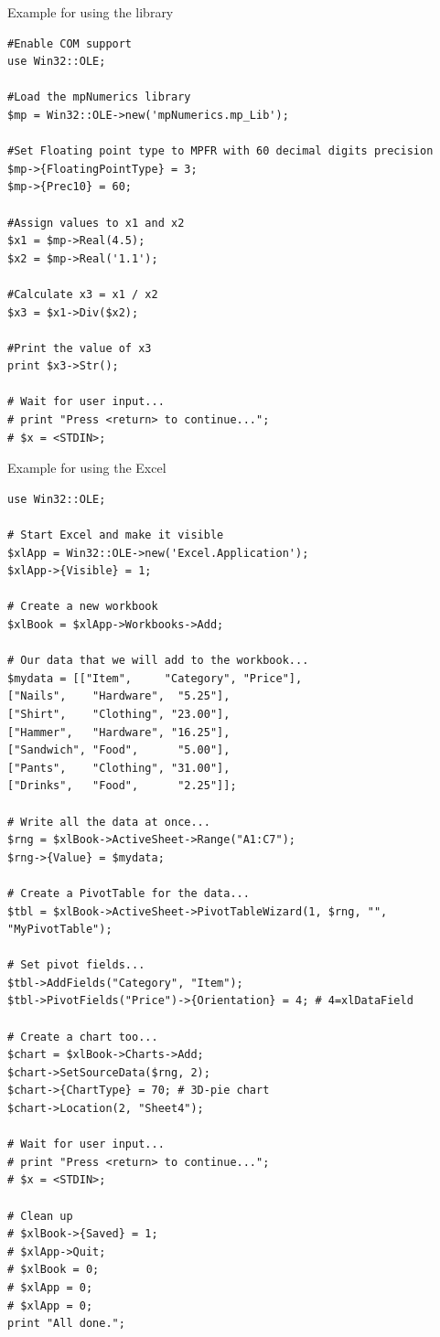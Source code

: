 \vpara
Example for using the library

\begin{lstlisting}
#Enable COM support
use Win32::OLE;

#Load the mpNumerics library
$mp = Win32::OLE->new('mpNumerics.mp_Lib');

#Set Floating point type to MPFR with 60 decimal digits precision
$mp->{FloatingPointType} = 3;
$mp->{Prec10} = 60;

#Assign values to x1 and x2
$x1 = $mp->Real(4.5);
$x2 = $mp->Real('1.1');

#Calculate x3 = x1 / x2
$x3 = $x1->Div($x2);

#Print the value of x3
print $x3->Str();

# Wait for user input...
# print "Press <return> to continue...";
# $x = <STDIN>;
\end{lstlisting}


\vpara
Example for using the Excel

\begin{lstlisting}
use Win32::OLE;

# Start Excel and make it visible
$xlApp = Win32::OLE->new('Excel.Application');
$xlApp->{Visible} = 1;

# Create a new workbook
$xlBook = $xlApp->Workbooks->Add;

# Our data that we will add to the workbook...
$mydata = [["Item",     "Category", "Price"], 
["Nails",    "Hardware",  "5.25"],
["Shirt",    "Clothing", "23.00"],
["Hammer",   "Hardware", "16.25"],
["Sandwich", "Food",      "5.00"],
["Pants",    "Clothing", "31.00"],
["Drinks",   "Food",      "2.25"]];

# Write all the data at once...
$rng = $xlBook->ActiveSheet->Range("A1:C7");
$rng->{Value} = $mydata;

# Create a PivotTable for the data...
$tbl = $xlBook->ActiveSheet->PivotTableWizard(1, $rng, "", "MyPivotTable");

# Set pivot fields...
$tbl->AddFields("Category", "Item");
$tbl->PivotFields("Price")->{Orientation} = 4; # 4=xlDataField

# Create a chart too...
$chart = $xlBook->Charts->Add;
$chart->SetSourceData($rng, 2);
$chart->{ChartType} = 70; # 3D-pie chart
$chart->Location(2, "Sheet4");

# Wait for user input...
# print "Press <return> to continue...";
# $x = <STDIN>;

# Clean up
# $xlBook->{Saved} = 1;
# $xlApp->Quit;
# $xlBook = 0;
# $xlApp = 0;
# $xlApp = 0;
print "All done.";
\end{lstlisting}






